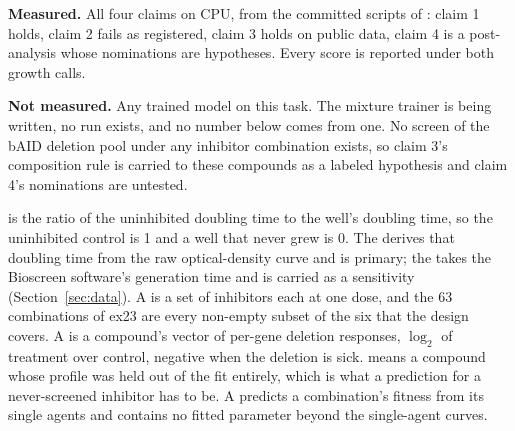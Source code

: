 \begin{keybox}
\textbf{Measured.} All four claims on CPU, from the committed scripts of
: claim 1 holds, claim 2 fails as
registered, claim 3 holds on public data, claim 4 is a post-analysis whose nominations
are hypotheses. Every score is reported under both growth calls.

\textbf{Not measured.} Any trained model on this task. The mixture trainer is being
written, no run exists, and no number below comes from one. No screen of the bAID
deletion pool under any inhibitor combination exists, so claim 3's composition rule is
carried to these compounds as a labeled hypothesis and claim 4's nominations are
untested.
\end{keybox}

  is the ratio of the uninhibited doubling time to the
well's doubling time, so the uninhibited control is 1 and a well that never grew is 0.
The  derives that doubling time from the raw optical-density curve and
is primary; the  takes the Bioscreen software's generation time and
is carried as a sensitivity (Section~\ref{sec:data}). A  is a set of
inhibitors each at one dose, and the 63 combinations of ex23 are every non-empty subset
of the six that the design covers. A  is a compound's vector of per-gene
deletion responses, $\log_2$ of treatment over control, negative when the deletion is
sick.  means a compound whose profile was held out of the fit
entirely, which is what a prediction for a never-screened inhibitor has to be. A
 predicts a combination's fitness from its single agents and
contains no fitted parameter beyond the single-agent curves.
